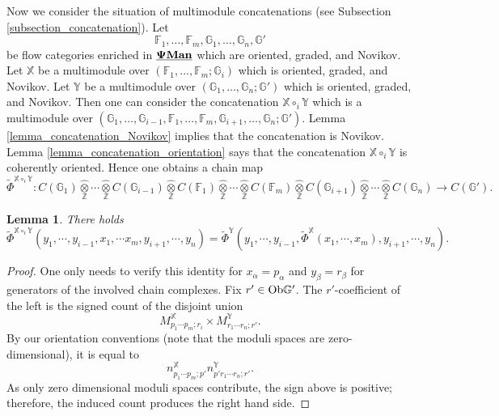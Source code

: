 \documentclass[reqno, 10pt]{amsart}
\numberwithin{equation}{section}
\numberwithin{equation}{section}
\newtheorem{lemma}[thm]{Lemma}
\theoremstyle{definition}
\theoremstyle{remark}
\newcommand{\beqn}{\begin{equation*}}
\newcommand{\eeqn}{\end{equation*}}
\newcommand{\mb}{\mathbb}
\newcommand{\pman}{\uds{{\bf \Psi}{\bf Man}}}
\newcommand{\uds}[1]{\underline{\smash{#1}}}
\begin{document}
Now we consider the situation of multimodule concatenations (see Subsection \ref{subsection_concatenation}). Let 
\beqn
{\mb F}_1, \ldots, {\mb F}_m, {\mb G}_1, \ldots, {\mb G}_n, {\mb G}'
\eeqn
be flow categories enriched in $\pman$ which are oriented, graded, and Novikov. Let ${\mb X}$ be a multimodule over $({\mb F}_1, \ldots, {\mb F}_m; {\mb G}_i)$ which is oriented, graded, and Novikov. Let ${\mb Y}$ be a multimodule over $({\mb G}_1, \ldots, {\mb G}_n; {\mb G}')$ which is oriented, graded, and Novikov. Then one can consider the concatenation ${\mb X} \circ_i {\mb Y}$ which is a multimodule over $({\mb G}_1, \ldots, {\mb G}_{i-1}, {\mb F}_1, \ldots, {\mb F}_m, {\mb G}_{i+1}, \ldots, {\mb G}_n; {\mb G}')$. Lemma \ref{lemma_concatenation_Novikov} implies that the concatenation is Novikov. Lemma \ref{lemma_concatenation_orientation} says that the concatenation ${\mb X} \circ_i {\mb Y}$ is coherently oriented. Hence one obtains a chain map
\beqn
\tilde{\Phi}^{{\mb X} \circ_i {\mb Y}}: C({\mb G}_1) \widehat{\underset{\mb Z}{\otimes}} \cdots \widehat{\underset{\mb Z}{\otimes}} C({\mb G}_{i-1}) \widehat{\underset{\mb Z}{\otimes}} C ({\mb F}_1) \widehat{\underset{\mb Z}{\otimes}} \cdots \widehat{\underset{\mb Z}{\otimes}} C ({\mb F}_m) \widehat{\underset{\mb Z}{\otimes}} C ({\mb G}_{i+1}) \widehat{\underset{\mb Z}{\otimes}} \cdots \widehat{\underset{\mb Z}{\otimes}} C ({\mb G}_n) \to C ({\mb G}').
\eeqn

\begin{lemma}\label{lemma719}
There holds
\beqn
\tilde{\Phi}^{{\mb X} \circ_i {\mb Y}} (y_1, \cdots, y_{i-1}, x_1, \cdots x_m, y_{i+1}, \cdots, y_n) = \tilde{\Phi}^{\mb Y}(y_1, \cdots, y_{i-1}, \tilde{\Phi}^{\mb X}(x_1, \cdots, x_m), y_{i+1}, \cdots, y_n).
\eeqn
\end{lemma}

\begin{proof}
One only needs to verify this identity for $x_\alpha = p_\alpha$ and $y_\beta = r_\beta$ for generators of the involved chain complexes. Fix $r' \in {\rm Ob}{\mb G}'$. The $r'$-coefficient of the left is the signed count of the disjoint union
\beqn
M_{p_1 \cdots p_m; r_i}^{\mb X} \times M_{r_1 \cdots r_n; r'}^{\mb Y}.
\eeqn
By our orientation conventions (note that the moduli spaces are zero-dimensional), it is equal to 
\beqn
n_{p_1\cdots p_m; p'}^{\mb X} n_{p' r_1 \cdots r_n; r'}^{\mb Y}.
\eeqn
As only zero dimensional moduli spaces contribute, the sign above is positive; therefore, the induced count produces the right hand side.
\end{proof}
\end{document}
